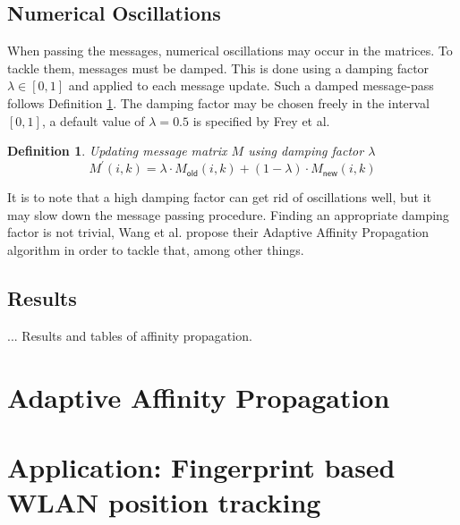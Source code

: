 \documentclass[11pt,a4paper]{article}
\newtheorem{definition}{Definition}
\begin{document}
\subsection{Numerical Oscillations}
When passing the messages, numerical oscillations may occur in the matrices. To tackle them, messages must be damped. This is done using a damping factor $\lambda \in \left[0,1\right]$ and applied to each message update. Such a damped message-pass follows Definition \ref{def:dampupdate}. The damping factor may be chosen freely in the interval $[0,1]$, a default value of $\lambda = 0.5$ is specified by Frey et al. \cite{frey2007clustering}
\begin{definition}\label{def:dampupdate}
	Updating message matrix $M$ using damping factor $\lambda$
	\[
		M^\prime (i,k) =\lambda \cdot M_{\mathsf{old}}(i,k) + (1-\lambda) \cdot M_{\mathsf{new}} (i,k)
	\]
\end{definition}
It is to note that a high damping factor can get rid of oscillations well, but it may slow down the message passing procedure.\cite{wang2008adaptive} Finding an appropriate damping factor is not trivial, Wang et al. propose their Adaptive Affinity Propagation algorithm in order to tackle that, among other things.\cite{wang2008adaptive}
\pagebreak
\subsection{Results}
... Results and tables of affinity propagation.
\section{Adaptive Affinity Propagation}
\section{Application: Fingerprint based WLAN position tracking}


\end{document}
